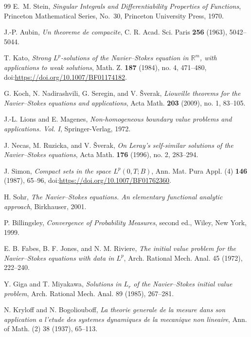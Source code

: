 \documentclass[11pt]{amsart}
\theoremstyle{plain}
\theoremstyle{definition}
\theoremstyle{remark}
\numberwithin{equation}{section}
\begin{document}
\begin{thebibliography}{99}
E.~M. Stein,
\emph{Singular Integrals and Differentiability Properties of Functions},
Princeton Mathematical Series, No.~30, Princeton University Press, 1970.

J.-P. Aubin,
\emph{Un theoreme de compacite},
C. R. Acad. Sci. Paris \textbf{256} (1963), 5042--5044.

T. Kato,
\emph{Strong \(L^p\)-solutions of the Navier--Stokes equation in
\(\mathbb R^m\), with applications to weak solutions},
Math. Z. \textbf{187} (1984), no. 4, 471--480,
doi:\url{https://doi.org/10.1007/BF01174182}.

G. Koch, N. Nadirashvili, G. Seregin, and V. \v{S}verak,
\emph{Liouville theorems for the Navier--Stokes equations and applications},
Acta Math. \textbf{203} (2009), no. 1, 83--105.

J.-L. Lions and E. Magenes,
\emph{Non-homogeneous boundary value problems and applications. Vol. I},
Springer-Verlag, 1972.

J. Necas, M. Ruzicka, and V. \v{S}verak,
\emph{On Leray's self-similar solutions of the Navier--Stokes equations},
Acta Math. \textbf{176} (1996), no. 2, 283--294.

J. Simon,
\emph{Compact sets in the space \(L^p(0,T;B)\)},
Ann. Mat. Pura Appl. (4) \textbf{146} (1987), 65--96,
doi:\url{https://doi.org/10.1007/BF01762360}.

H. Sohr,
\emph{The Navier--Stokes equations. An elementary functional analytic approach},
Birkhauser, 2001.

P. Billingsley,
\emph{Convergence of Probability Measures}, second ed.,
Wiley, New York, 1999.

E. B. Fabes, B. F. Jones, and N. M. Riviere,
\emph{The initial value problem for the Navier--Stokes equations with data in
\(L^p\)},
Arch. Rational Mech. Anal. 45 (1972), 222--240.

Y. Giga and T. Miyakawa,
\emph{Solutions in \(L_r\) of the Navier--Stokes initial value problem},
Arch. Rational Mech. Anal. 89 (1985), 267--281.

N. Kryloff and N. Bogoliouboff,
\emph{La theorie generale de la mesure dans son application a l'etude des
systemes dynamiques de la mecanique non lineaire},
Ann. of Math. (2) 38 (1937), 65--113.


\end{thebibliography}
\end{document}
